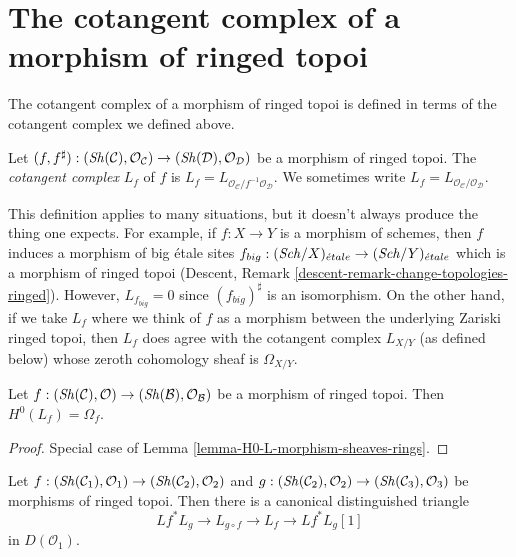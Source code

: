\section{The cotangent complex of a morphism of ringed topoi}
\label{section-cotangent-morphism-ringed-topoi}

\noindent
The cotangent complex of a morphism of ringed topoi is defined
in terms of the cotangent complex we defined above.

\begin{definition}
\label{definition-cotangent-complex-morphism-ringed-topoi}
Let $(f, f^\sharp) : (\mathop{\mathit{Sh}}\nolimits(\mathcal{C}), \mathcal{O}_\mathcal{C}) \to
(\mathop{\mathit{Sh}}\nolimits(\mathcal{D}), \mathcal{O}_\mathcal{D})$ be a morphism of ringed topoi.
The {\it cotangent complex} $L_f$ of $f$ is
$L_f = L_{\mathcal{O}_\mathcal{C}/f^{-1}\mathcal{O}_\mathcal{D}}$.
We sometimes write $L_f = L_{\mathcal{O}_\mathcal{C}/\mathcal{O}_\mathcal{D}}$.
\end{definition}

\noindent
This definition applies to many situations, but it doesn't always produce
the thing one expects. For example, if $f : X \to Y$ is a morphism of
schemes, then $f$ induces a morphism of big \'etale sites
$f_{big} : (\mathit{Sch}/X)_{\acute{e}tale} \to (\mathit{Sch}/Y)_{\acute{e}tale}$
which is a morphism of ringed topoi (Descent, Remark
\ref{descent-remark-change-topologies-ringed}).
However, $L_{f_{big}} = 0$ since $(f_{big})^\sharp$ is an isomorphism.
On the other hand, if we take $L_f$ where we think of $f$ as a morphism
between the underlying Zariski ringed topoi, then $L_f$ does agree with
the cotangent complex $L_{X/Y}$ (as defined below)
whose zeroth cohomology sheaf is $\Omega_{X/Y}$.

\begin{lemma}
\label{lemma-H0-L-morphism-ringed-topoi}
Let $f : (\mathop{\mathit{Sh}}\nolimits(\mathcal{C}), \mathcal{O}) \to
(\mathop{\mathit{Sh}}\nolimits(\mathcal{B}), \mathcal{O}_\mathcal{B})$ be a morphism of
ringed topoi. Then $H^0(L_f) = \Omega_f$.
\end{lemma}

\begin{proof}
Special case of Lemma \ref{lemma-H0-L-morphism-sheaves-rings}.
\end{proof}

\begin{lemma}
\label{lemma-triangle-ringed-topoi}
Let $f : (\mathop{\mathit{Sh}}\nolimits(\mathcal{C}_1), \mathcal{O}_1) \to
(\mathop{\mathit{Sh}}\nolimits(\mathcal{C}_2), \mathcal{O}_2)$ and
$g : (\mathop{\mathit{Sh}}\nolimits(\mathcal{C}_2), \mathcal{O}_2) \to
(\mathop{\mathit{Sh}}\nolimits(\mathcal{C}_3), \mathcal{O}_3)$ be morphisms of ringed topoi.
Then there is a canonical distinguished triangle
$$
Lf^* L_g \to L_{g \circ f} \to L_f \to Lf^*L_g[1]
$$
in $D(\mathcal{O}_1)$.
\end{lemma}

